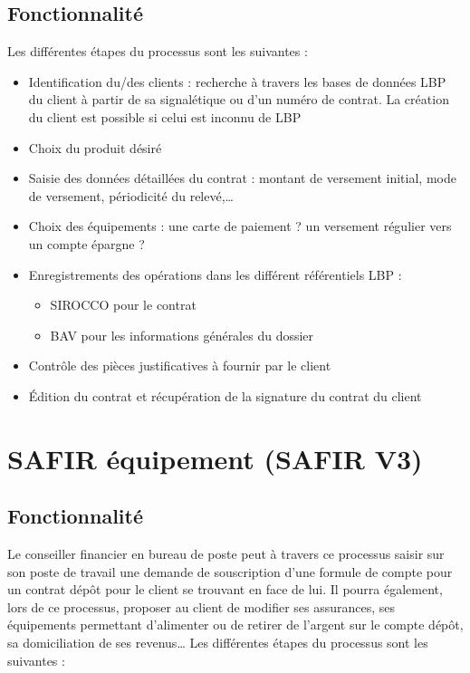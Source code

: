 \subsection{Fonctionnalité}
Les différentes étapes du processus sont les suivantes :\\
\begin{itemize}
\item Identification du/des clients : recherche à travers les bases de données LBP du client à partir de sa signalétique ou d’un numéro de contrat. La création du client est possible si celui est inconnu de LBP
\item Choix du produit désiré
\item Saisie des données détaillées du contrat : montant de versement initial, mode de versement, périodicité du relevé,…
\item Choix des équipements : une carte de paiement ? un versement régulier vers un compte épargne ?
\item Enregistrements des opérations dans les différent référentiels LBP :\begin{itemize}
												   \item SIROCCO pour le contrat
												   \item BAV pour les informations générales du dossier
												   \end{itemize}

\item Contrôle des pièces justificatives à fournir par le client
\item Édition du contrat et récupération de la signature du contrat du client
\end{itemize}

\section{SAFIR équipement (SAFIR V3)}

\subsection{Fonctionnalité}
Le conseiller financier en bureau de poste peut à travers ce processus saisir sur son poste de travail une demande de souscription d’une formule de compte pour un contrat dépôt pour le client se trouvant en face de lui. 
Il pourra également, lors de ce processus, proposer au client de modifier ses assurances, ses équipements permettant d’alimenter ou de retirer de l’argent sur le compte dépôt, sa domiciliation de ses revenus…
Les différentes étapes du processus sont les suivantes :

